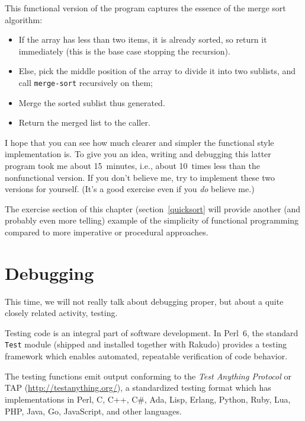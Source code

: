 This functional version of the program captures  
the essence of the merge sort algorithm:
\begin{itemize}
\item If the  array has less than two items, it is already 
sorted, so return it immediately (this is the base case 
stopping the recursion).
\item Else, pick the middle position of the array to divide 
it into two sublists, and call \verb'merge-sort' recursively 
on them;
\item Merge the sorted sublist thus generated.
\item Return the merged list to the caller.
\end{itemize}

I hope that you can see how much clearer and simpler the 
functional style implementation is. To give you an idea, 
writing and debugging this latter program took me about 
15~minutes, i.e., about 10~times less than the 
nonfunctional version. If you don't believe me, try to 
implement these two versions for yourself. (It's a good 
exercise even if you \emph{do} believe me.)

The exercise section of this chapter (section~\ref{quicksort} 
will provide another (and probably even more telling) example 
of the simplicity of functional programming compared to more 
imperative or procedural approaches.


\section{Debugging}
\label{test_module}

This time, we will not really talk about debugging proper, 
but about a quite closely related activity, testing.

Testing code is an integral part of software development. In 
Perl~6, the standard {\tt Test} module (shipped and installed 
together with Rakudo) provides a testing framework which enables 
automated, repeatable verification of code behavior.

The testing functions emit output conforming to the \emph{Test 
Anything Protocol} or TAP (\url{http://testanything.org/}), a 
standardized testing format which has implementations in Perl, 
C, C++, C\#, Ada, Lisp, Erlang, Python, Ruby, Lua, PHP, Java, 
Go, JavaScript, and other languages.

